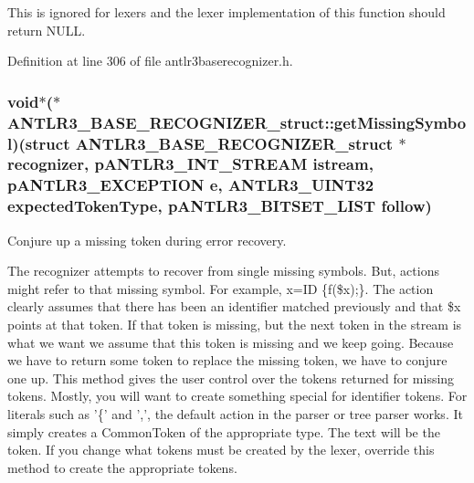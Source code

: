This is ignored for lexers and the lexer implementation of this function should return N\-U\-L\-L. 

Definition at line 306 of file antlr3baserecognizer.\-h.

\hypertarget{struct_a_n_t_l_r3___b_a_s_e___r_e_c_o_g_n_i_z_e_r__struct_a18f404134e33bf360d9257d9be9588c8}{
\subsubsection[{get\-Missing\-Symbol}]{\setlength{\rightskip}{0pt plus 5cm}void$\ast$($\ast$ A\-N\-T\-L\-R3\-\_\-\-B\-A\-S\-E\-\_\-\-R\-E\-C\-O\-G\-N\-I\-Z\-E\-R\-\_\-struct\-::get\-Missing\-Symbol)(struct {\bf A\-N\-T\-L\-R3\-\_\-\-B\-A\-S\-E\-\_\-\-R\-E\-C\-O\-G\-N\-I\-Z\-E\-R\-\_\-struct} $\ast${\bf recognizer}, {\bf p\-A\-N\-T\-L\-R3\-\_\-\-I\-N\-T\-\_\-\-S\-T\-R\-E\-A\-M} istream, {\bf p\-A\-N\-T\-L\-R3\-\_\-\-E\-X\-C\-E\-P\-T\-I\-O\-N} e, {\bf A\-N\-T\-L\-R3\-\_\-\-U\-I\-N\-T32} expected\-Token\-Type, {\bf p\-A\-N\-T\-L\-R3\-\_\-\-B\-I\-T\-S\-E\-T\-\_\-\-L\-I\-S\-T} {\bf follow})}}\label{struct_a_n_t_l_r3___b_a_s_e___r_e_c_o_g_n_i_z_e_r__struct_a18f404134e33bf360d9257d9be9588c8}
Conjure up a missing token during error recovery.

The recognizer attempts to recover from single missing symbols. But, actions might refer to that missing symbol. For example, x=I\-D \{f(\$x);\}. The action clearly assumes that there has been an identifier matched previously and that \$x points at that token. If that token is missing, but the next token in the stream is what we want we assume that this token is missing and we keep going. Because we have to return some token to replace the missing token, we have to conjure one up. This method gives the user control over the tokens returned for missing tokens. Mostly, you will want to create something special for identifier tokens. For literals such as '\{' and ',', the default action in the parser or tree parser works. It simply creates a Common\-Token of the appropriate type. The text will be the token. If you change what tokens must be created by the lexer, override this method to create the appropriate tokens. 


